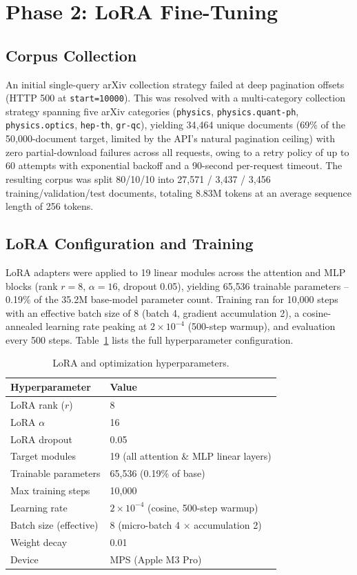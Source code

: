 \documentclass[11pt]{article}
\begin{document}
\section{Phase 2: LoRA Fine-Tuning}
\subsection{Corpus Collection}
An initial single-query arXiv collection strategy failed at deep pagination
offsets (HTTP 500 at \texttt{start=10000}). This was resolved with a
multi-category collection strategy spanning five arXiv categories
(\texttt{physics}, \texttt{physics.quant-ph}, \texttt{physics.optics},
\texttt{hep-th}, \texttt{gr-qc}), yielding 34{,}464 unique documents (69\%
of the 50{,}000-document target, limited by the API's natural pagination
ceiling) with zero partial-download failures across all requests, owing to
a retry policy of up to 60 attempts with exponential backoff and a 90-second
per-request timeout. The resulting corpus was split 80/10/10 into
27{,}571 / 3{,}437 / 3{,}456 training/validation/test documents, totaling
8.83M tokens at an average sequence length of 256 tokens.

\subsection{LoRA Configuration and Training}
LoRA adapters were applied to 19 linear modules across the attention and
MLP blocks (rank $r=8$, $\alpha=16$, dropout 0.05), yielding 65{,}536
trainable parameters -- 0.19\% of the 35.2M base-model parameter count.
Training ran for 10{,}000 steps with an effective batch size of 8 (batch 4,
gradient accumulation 2), a cosine-annealed learning rate peaking at
$2\times10^{-4}$ (500-step warmup), and evaluation every 500 steps.
Table~\ref{tab:lora-config} lists the full hyperparameter configuration.

\begin{table}[h]
\centering
\caption{LoRA and optimization hyperparameters.}
\label{tab:lora-config}
\begin{tabular}{@{}ll@{}}
\toprule
Hyperparameter & Value \\
\midrule
LoRA rank ($r$) & 8 \\
LoRA $\alpha$ & 16 \\
LoRA dropout & 0.05 \\
Target modules & 19 (all attention \& MLP linear layers) \\
Trainable parameters & 65{,}536 (0.19\% of base) \\
Max training steps & 10{,}000 \\
Learning rate & $2\times10^{-4}$ (cosine, 500-step warmup) \\
Batch size (effective) & 8 (micro-batch 4 $\times$ accumulation 2) \\
Weight decay & 0.01 \\
Device & MPS (Apple M3 Pro) \\
\bottomrule
\end{tabular}
\end{table}
\end{document}
